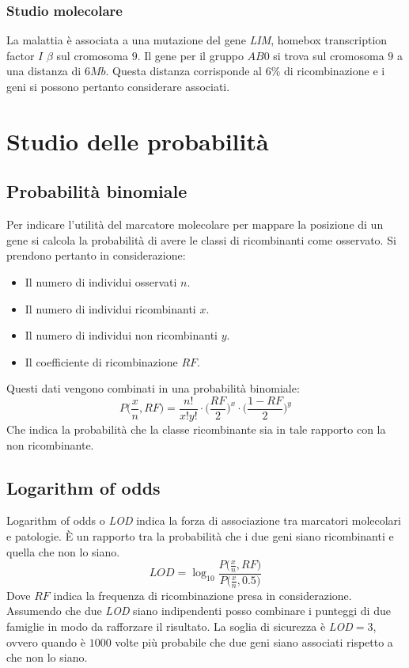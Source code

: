 		\subsubsection{Studio molecolare}
		La malattia \`e associata a una mutazione del gene \emph{LIM}, homebox transcription factor $I$ $\beta$ sul cromosoma $9$.
		Il gene per il gruppo $AB0$ si trova sul cromosoma $9$ a una distanza di $6Mb$.
		Questa distanza corrisponde al $6\%$ di ricombinazione e i geni si possono pertanto considerare associati.
		
\section{Studio delle probabilit\`a}

	\subsection{Probabilit\`a binomiale}
	Per indicare l'utilit\`a del marcatore molecolare per mappare la posizione di un gene si calcola la probabilit\`a di avere le classi di ricombinanti come osservato.
	Si prendono pertanto in considerazione:
	\begin{multicols}{2}
		\begin{itemize}
			\item Il numero di individui osservati $n$.
			\item Il numero di individui ricombinanti $x$.
			\item Il numero di individui non ricombinanti $y$.
			\item Il coefficiente di ricombinazione $RF$.
		\end{itemize}
	\end{multicols}
	Questi dati vengono combinati in una probabilit\`a binomiale:
	\[P\biggl(\dfrac{x}{n}, RF\biggr)=\dfrac{n!}{x!y!}\cdot\biggl(\dfrac{RF}{2}\biggr)^x\cdot\biggl(\dfrac{1-RF}{2}\biggr)^y\]
	Che indica la probabilit\`a che la classe ricombinante sia in tale rapporto con la non ricombinante.

	\subsection{Logarithm of odds}
	Logarithm of odds o \emph{LOD} indica la forza di associazione tra marcatori molecolari e patologie.
	\`E un rapporto tra la probabilit\`a che i due geni siano ricombinanti e quella che non lo siano.
	\[LOD = \log_{10}\dfrac{P\bigl(\frac{x}{n}, RF\bigr)}{P\bigl(\frac{x}{n}, 0.5\bigr)}\]
	Dove $RF$ indica la frequenza di ricombinazione presa in considerazione.
	Assumendo che due \emph{LOD} siano indipendenti posso combinare i punteggi di due famiglie in modo da rafforzare il risultato.
	La soglia di sicurezza \`e \emph{LOD$=3$}, ovvero quando \`e $1000$ volte pi\`u probabile che due geni siano associati rispetto a che non lo siano.

